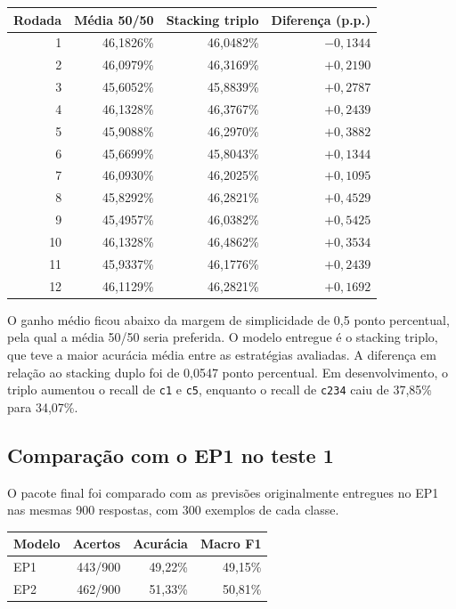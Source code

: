 \documentclass[11pt,a4paper]{article}
\begin{document}
\begingroup\small
\begin{longtable}{@{}rrrr@{}}
\toprule
\textbf{Rodada} & \textbf{Média 50/50} & \textbf{Stacking triplo} & \textbf{Diferença (p.p.)}\\
\midrule
1 & 46,1826\% & 46,0482\% & $-0{,}1344$\\
2 & 46,0979\% & 46,3169\% & $+0{,}2190$\\
3 & 45,6052\% & 45,8839\% & $+0{,}2787$\\
4 & 46,1328\% & 46,3767\% & $+0{,}2439$\\
5 & 45,9088\% & 46,2970\% & $+0{,}3882$\\
6 & 45,6699\% & 45,8043\% & $+0{,}1344$\\
7 & 46,0930\% & 46,2025\% & $+0{,}1095$\\
8 & 45,8292\% & 46,2821\% & $+0{,}4529$\\
9 & 45,4957\% & 46,0382\% & $+0{,}5425$\\
10 & 46,1328\% & 46,4862\% & $+0{,}3534$\\
11 & 45,9337\% & 46,1776\% & $+0{,}2439$\\
12 & 46,1129\% & 46,2821\% & $+0{,}1692$\\
\bottomrule
\end{longtable}
\endgroup

O ganho médio ficou abaixo da margem de simplicidade de 0,5 ponto percentual, pela qual a média 50/50 seria preferida. O modelo entregue é o stacking triplo, que teve a maior acurácia média entre as estratégias avaliadas. A diferença em relação ao stacking duplo foi de 0,0547 ponto percentual. Em desenvolvimento, o triplo aumentou o recall de \nolinkurl{c1} e \nolinkurl{c5}, enquanto o recall de \nolinkurl{c234} caiu de 37,85\% para 34,07\%.

\clearpage
\subsection{Comparação com o EP1 no teste 1}

O pacote final foi comparado com as previsões originalmente entregues no EP1 nas mesmas 900 respostas, com 300 exemplos de cada classe.

\begingroup\small
\begin{longtable}{@{}lrrr@{}}
\toprule
\textbf{Modelo} & \textbf{Acertos} & \textbf{Acurácia} & \textbf{Macro F1}\\
\midrule
EP1 & 443/900 & 49,22\% & 49,15\%\\
EP2 & 462/900 & 51,33\% & 50,81\%\\
\bottomrule
\end{longtable}
\endgroup
\end{document}
